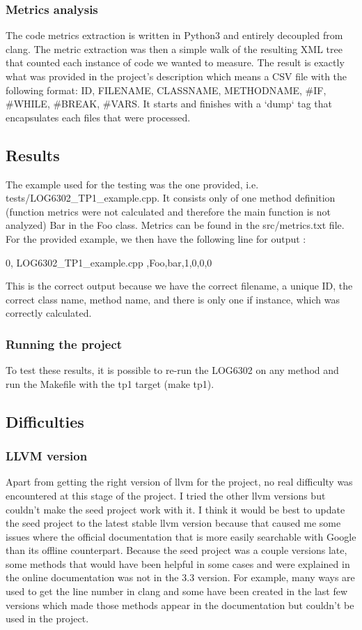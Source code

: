 \documentclass[conference,compsoc]{IEEEtran}
\begin{document}
\subsubsection{Metrics analysis}
The code metrics extraction is written in Python3 and entirely decoupled from clang. 
The metric extraction was then a simple walk of the resulting XML tree that counted each instance of code we wanted to measure.
The result is exactly what was provided in the project's description which means
 a CSV file with the following 
format: ID, FILENAME, CLASSNAME, METHODNAME, \#IF, \#WHILE, \#BREAK, \#VARS.
 It starts and finishes with a `dump` tag that 
encapsulates each files that were processed.

\subsection{Results}

The example used for the testing was the one provided, i.e. tests/LOG6302\_TP1\_example.cpp.
 It consists only of one method definition (function metrics were not calculated and
 therefore the main function is not analyzed) Bar in the Foo class. Metrics can be found in
 the src/metrics.txt file. For the provided example, we then have the following line for
 output :
\par
0, LOG6302\_TP1\_example.cpp ,Foo,bar,1,0,0,0
\par

This is the correct output because we have the correct filename, a unique ID,
 the correct class name, method name, and there is only one if instance, which was
 correctly calculated.
\subsubsection{Running the project}
To test these results, it is possible to re-run the LOG6302 on any method and
 run the Makefile with the tp1 target (make tp1).


\subsection{Difficulties}

\subsubsection{LLVM version}

Apart from getting the right version of llvm for the project, no real difficulty was encountered at this stage of the project.
 I tried the other llvm versions but couldn't make the seed project work with it. I think it would be best to update the seed
 project to the latest stable llvm version because that caused me some issues where the official documentation that is more 
 easily searchable with Google than its offline counterpart. Because the seed project was a couple versions late, some methods
 that would have been helpful in some cases and were explained in the online documentation was not in the 3.3 version.
 For example, many ways are used to get the line number in clang and some have been created in the last few versions which
 made those methods appear in the documentation but couldn't be used in the project.
\end{document}
